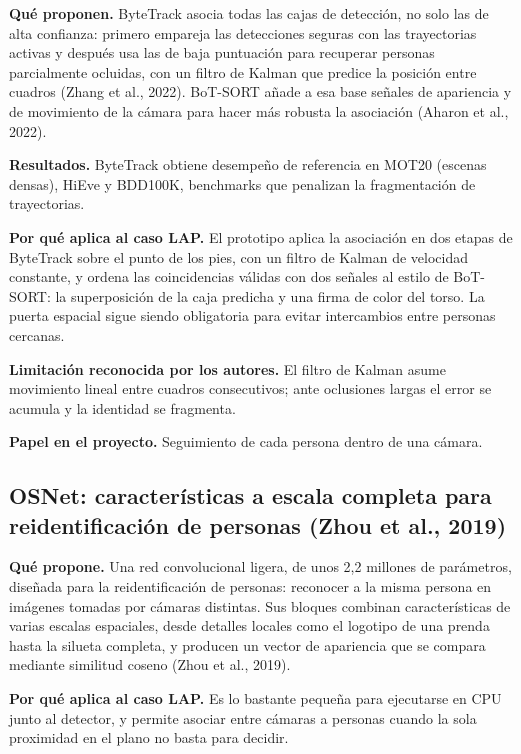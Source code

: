 \textbf{Qué proponen.} ByteTrack asocia todas las cajas de detección, no solo las de alta
confianza: primero empareja las detecciones seguras con las trayectorias activas y después usa
las de baja puntuación para recuperar personas parcialmente ocluidas, con un filtro de Kalman
que predice la posición entre cuadros (Zhang et al., 2022). BoT-SORT añade a esa base señales
de apariencia y de movimiento de la cámara para hacer más robusta la asociación (Aharon et al.,
2022).

\textbf{Resultados.} ByteTrack obtiene desempeño de referencia en MOT20 (escenas densas),
HiEve y BDD100K, benchmarks que penalizan la fragmentación de trayectorias.

\textbf{Por qué aplica al caso LAP.} El prototipo aplica la asociación en dos etapas de ByteTrack
sobre el punto de los pies, con un filtro de Kalman de velocidad constante, y ordena las
coincidencias válidas con dos señales al estilo de BoT-SORT: la superposición de la caja
predicha y una firma de color del torso. La puerta espacial sigue siendo obligatoria para evitar
intercambios entre personas cercanas.

\textbf{Limitación reconocida por los autores.} El filtro de Kalman asume movimiento lineal
entre cuadros consecutivos; ante oclusiones largas el error se acumula y la identidad se
fragmenta.

\textbf{Papel en el proyecto.} Seguimiento de cada persona dentro de una cámara.

\subsection{OSNet: características a escala completa para reidentificación de personas (Zhou et al., 2019)}
\label{subsec:osnet}

\textbf{Qué propone.} Una red convolucional ligera, de unos 2,2 millones de parámetros, diseñada
para la reidentificación de personas: reconocer a la misma persona en imágenes tomadas por
cámaras distintas. Sus bloques combinan características de varias escalas espaciales, desde
detalles locales como el logotipo de una prenda hasta la silueta completa, y producen un
vector de apariencia que se compara mediante similitud coseno (Zhou et al., 2019).

\textbf{Por qué aplica al caso LAP.} Es lo bastante pequeña para ejecutarse en CPU junto al
detector, y permite asociar entre cámaras a personas cuando la sola proximidad en el plano no
basta para decidir.

